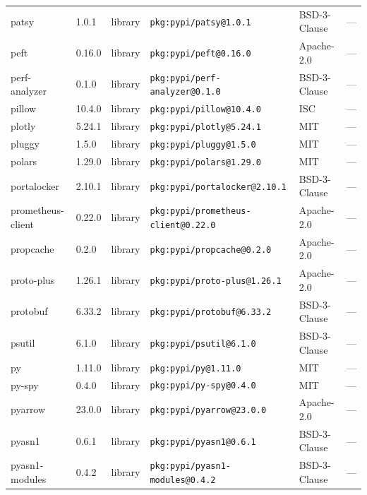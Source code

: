 \documentclass[11pt,a4paper]{article}
\begin{document}
\begin{longtable}{|p{4cm}|p{2cm}|p{1.6cm}|p{5cm}|p{1.5cm}|p{3.5cm}|}
\raggedright patsy & 1.0.1 & library & \small\texttt{pkg:pypi/patsy@1.0.1} & BSD-3-Clause & \small — \\
\raggedright peft & 0.16.0 & library & \small\texttt{pkg:pypi/peft@0.16.0} & Apache-2.0 & \small — \\
\raggedright perf-analyzer & 0.1.0 & library & \small\texttt{pkg:pypi/perf-analyzer@0.1.0} & BSD-3-Clause & \small — \\
\raggedright pillow & 10.4.0 & library & \small\texttt{pkg:pypi/pillow@10.4.0} & ISC & \small — \\
\raggedright plotly & 5.24.1 & library & \small\texttt{pkg:pypi/plotly@5.24.1} & MIT & \small — \\
\raggedright pluggy & 1.5.0 & library & \small\texttt{pkg:pypi/pluggy@1.5.0} & MIT & \small — \\
\raggedright polars & 1.29.0 & library & \small\texttt{pkg:pypi/polars@1.29.0} & MIT & \small — \\
\raggedright portalocker & 2.10.1 & library & \small\texttt{pkg:pypi/portalocker@2.10.1} & BSD-3-Clause & \small — \\
\raggedright prometheus-client & 0.22.0 & library & \small\texttt{pkg:pypi/prometheus-client@0.22.0} & Apache-2.0 & \small — \\
\raggedright propcache & 0.2.0 & library & \small\texttt{pkg:pypi/propcache@0.2.0} & Apache-2.0 & \small — \\
\raggedright proto-plus & 1.26.1 & library & \small\texttt{pkg:pypi/proto-plus@1.26.1} & Apache-2.0 & \small — \\
\raggedright protobuf & 6.33.2 & library & \small\texttt{pkg:pypi/protobuf@6.33.2} & BSD-3-Clause & \small — \\
\raggedright psutil & 6.1.0 & library & \small\texttt{pkg:pypi/psutil@6.1.0} & BSD-3-Clause & \small — \\
\raggedright py & 1.11.0 & library & \small\texttt{pkg:pypi/py@1.11.0} & MIT & \small — \\
\raggedright py-spy & 0.4.0 & library & \small\texttt{pkg:pypi/py-spy@0.4.0} & MIT & \small — \\
\raggedright pyarrow & 23.0.0 & library & \small\texttt{pkg:pypi/pyarrow@23.0.0} & Apache-2.0 & \small — \\
\raggedright pyasn1 & 0.6.1 & library & \small\texttt{pkg:pypi/pyasn1@0.6.1} & BSD-3-Clause & \small — \\
\raggedright pyasn1-modules & 0.4.2 & library & \small\texttt{pkg:pypi/pyasn1-modules@0.4.2} & BSD-3-Clause & \small — \\

\end{longtable}
\end{document}

